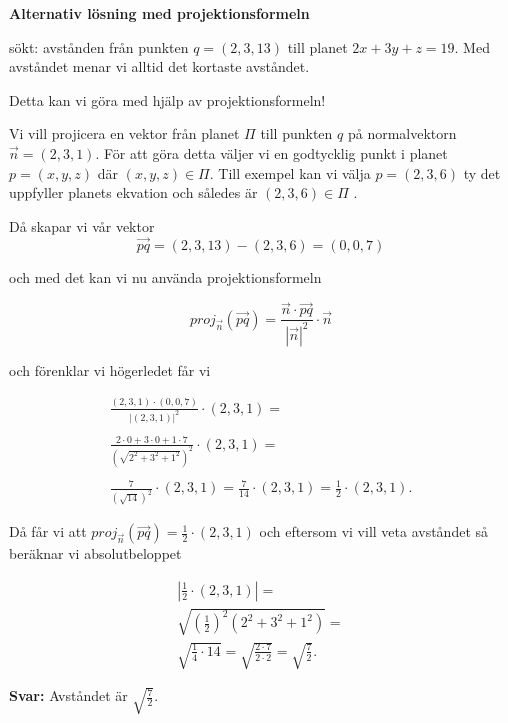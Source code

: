 \documentclass[../../main.tex]{subfiles}
\begin{document}
\begin{solution}{18}
\textbf{Alternativ lösning med projektionsformeln}

sökt: avstånden från punkten $q=(2,3,13)$ till planet $2x + 3y + z = 19$. Med avståndet menar vi alltid det kortaste avståndet. 

Detta kan vi göra med hjälp av projektionsformeln!

Vi vill projicera en vektor från planet $\Pi$ till punkten $q$ på normalvektorn $\Vec{n}=(2, 3, 1)$. 
För att göra detta väljer vi en godtycklig punkt i planet $p=(x,y,z)$ där 
$(x,y,z) \in \Pi$. Till exempel kan vi välja $p=(2,3,6)$ ty det uppfyller planets ekvation och således är $(2,3,6) \in \Pi$ . 

Då skapar vi vår vektor $$\Vec{pq}=(2,3,13)-(2,3,6)=(0,0,7)$$

och med det kan vi nu använda projektionsformeln 

$$ proj_{\Vec{n}}(\Vec{pq})=\frac{\vec{n}\cdot\vec{pq}}{|\vec{n}|^2}\cdot\vec{n}$$

och förenklar vi högerledet får vi

\begin{align*}
\frac{(2, 3, 1)\cdot(0,0,7)}{|(2, 3, 1)|^2}\cdot(2, 3, 1) = \\
\\
\frac{2 \cdot 0 + 3\cdot 0 + 1\cdot 7}{ \left( \sqrt{2^2+3^2+1^2} \right)^2}\cdot(2, 3, 1) = \\
\\
\frac{7}{\left( \sqrt{14} \right)^2}\cdot(2, 3, 1)=\frac{7}{14}\cdot(2, 3, 1)=\frac{1}{2}\cdot(2, 3, 1). 
\end{align*}

Då får vi att $proj_{\Vec{n}}(\Vec{pq})=\frac{1}{2}\cdot(2, 3, 1)$ och eftersom vi vill veta avståndet så beräknar vi absolutbeloppet 

\begin{align*}
|\frac{1}{2}\cdot(2, 3, 1)| = \\
\sqrt{\left(\frac{1}{2}\right)^2\left( 2^2+3^2+1^2 \right)} = \\
\sqrt{\frac{1}{4}\cdot 14}=\sqrt{\frac{2\cdot 7}{2\cdot2}}=\sqrt{\frac{7}{2}}. 
\end{align*}

\textbf{Svar:} Avståndet är $\sqrt{\frac{7}{2}}$.

\end{solution}
\end{document}
